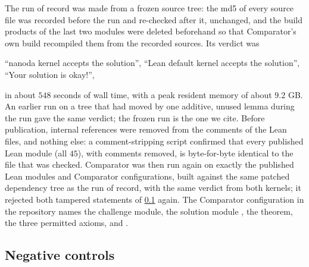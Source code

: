 \documentclass[11pt]{article}
\theoremstyle{definition}
\begin{document}
The run of record was made from a frozen source tree: the md5 of every source file was recorded before the run and re-checked after it, unchanged, and the build products of the last two modules were deleted beforehand so that Comparator's own build recompiled them from the recorded sources. Its verdict was
\begin{center}
``nanoda kernel accepts the solution'', \quad ``Lean default kernel accepts the solution'', \quad ``Your solution is okay!'',
\end{center}
in about $548$ seconds of wall time, with a peak resident memory of about $9.2$ GB. An earlier run on a tree that had moved by one additive, unused lemma during the run gave the same verdict; the frozen run is the one we cite. Before publication, internal references were removed from the comments of the Lean files, and nothing else: a comment-stripping script confirmed that every published Lean module (all $45$), with comments removed, is byte-for-byte identical to the file that was checked. Comparator was then run again on exactly the published Lean modules and Comparator configurations, built against the same patched dependency tree as the run of record, with the same verdict from both kernels; it rejected both tampered statements of \cref{sec:controls} again. The Comparator configuration  in the repository names the challenge module, the solution module , the theorem, the three permitted axioms, and .

\subsection{Negative controls}\label{sec:controls}
\end{document}
